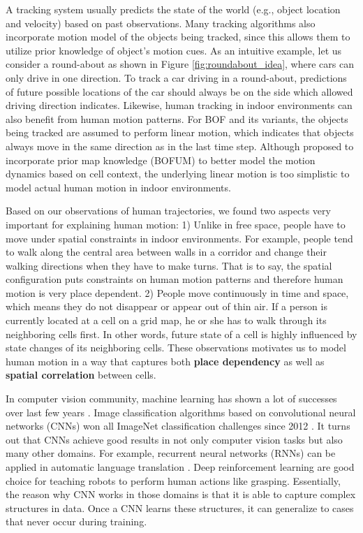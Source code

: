 A tracking system usually predicts the state of the world (e.g., object location and velocity) based on past observations. Many tracking algorithms also incorporate motion model of the objects being tracked, since this allows them to utilize prior knowledge of object's motion cues. As an intuitive example, let us consider a round-about as shown in Figure \ref{fig:roundabout_idea}, where cars can only drive in one direction. To track a car driving in a round-about, predictions of future possible locations of the car should always be on the side which allowed driving direction indicates. Likewise, human tracking in indoor environments can also benefit from human motion patterns. For BOF and its variants, the objects being tracked are assumed to perform linear motion, which indicates that objects always move in the same direction as in the last time step. Although \citet{gindele2009bayesian} proposed to incorporate prior map knowledge (BOFUM) to better model the motion dynamics based on cell context, the underlying linear motion is too simplistic to model actual human motion in indoor environments. 

Based on our observations of human trajectories, we found two aspects very important for explaining human motion: 1) Unlike in free space, people have to move under spatial constraints in indoor environments. For example, people tend to walk along the central area between walls in a corridor and change their walking directions when they have to make turns. That is to say, the spatial configuration puts constraints on human motion patterns and therefore human motion is very place dependent. 2) People move continuously in time and space, which means they do not disappear or appear out of thin air. If a person is currently located at a cell on a grid map, he or she has to walk through its neighboring cells first. In other words, future state of a cell is highly influenced by state changes of its neighboring cells. These observations motivates us to model human motion in a way that captures both \textbf{place dependency} as well as \textbf{spatial correlation} between cells.

In computer vision community, machine learning has shown a lot of successes over last few years . Image classification algorithms based on convolutional neural networks (CNNs) won all ImageNet classification challenges since 2012 \citep{russakovsky2015imagenet}. It turns out that CNNs achieve good results in not only computer vision tasks but also many other domains. For example, recurrent neural networks (RNNs) can be applied in automatic language translation \citep{cho2014learning}. Deep reinforcement learning are good choice for teaching robots to perform human actions like grasping\citep{levine2016learning}. Essentially, the reason why CNN works in those domains is that it is able to capture complex structures in data. Once a CNN learns these structures, it can generalize to cases that never occur during training. 

